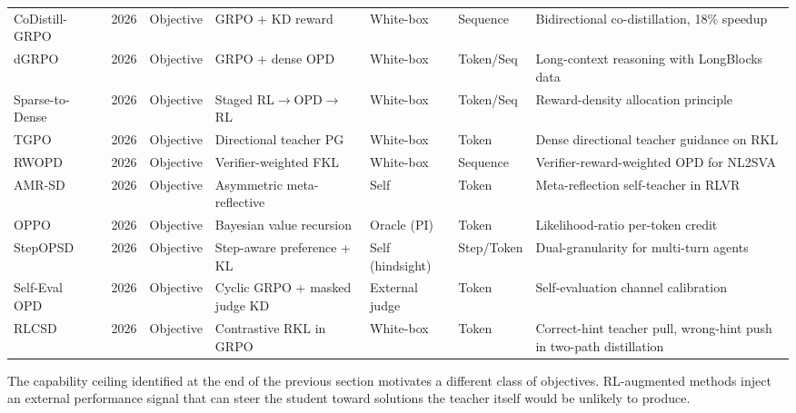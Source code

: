 \documentclass{article} %
\begin{document}
\begin{table}[t]
{\begin{tabular}{@{}lclllll@{}}
        CoDistill-GRPO~\citep{2605.08873} & 2026 & Objective & GRPO + KD reward & White-box & Sequence & Bidirectional co-distillation, 18\% speedup \\
        dGRPO~\citep{2605.12227} & 2026 & Objective & GRPO + dense OPD & White-box & Token/Seq & Long-context reasoning with LongBlocks data \\
        Sparse-to-Dense~\citep{2605.12483} & 2026 & Objective & Staged RL$\to$OPD$\to$RL & White-box & Token/Seq & Reward-density allocation principle \\
        TGPO~\citep{2605.13230} & 2026 & Objective & Directional teacher PG & White-box & Token & Dense directional teacher guidance on RKL \\
        RWOPD~\citep{2605.13501} & 2026 & Objective & Verifier-weighted FKL & White-box & Sequence & Verifier-reward-weighted OPD for NL2SVA \\
        AMR-SD~\citep{2605.18529} & 2026 & Objective & Asymmetric meta-reflective & Self & Token & Meta-reflection self-teacher in RLVR \\
        OPPO~\citep{2605.21851} & 2026 & Objective & Bayesian value recursion & Oracle (PI) & Token & Likelihood-ratio per-token credit \\
        StepOPSD~\citep{2605.27140} & 2026 & Objective & Step-aware preference + KL & Self (hindsight) & Step/Token & Dual-granularity for multi-turn agents \\
        Self-Eval OPD~\citep{2606.05122} & 2026 & Objective & Cyclic GRPO + masked judge KD & External judge & Token & Self-evaluation channel calibration \\
        RLCSD~\citep{2606.11709} & 2026 & Objective & Contrastive RKL in GRPO & White-box & Token & Correct-hint teacher pull, wrong-hint push in two-path distillation \\
        \bottomrule
    \end{tabular}
    }
\end{table}

The capability ceiling identified at the end of the previous section motivates a different class of objectives. RL-augmented methods inject an external performance signal that can steer the student toward solutions the teacher itself would be unlikely to produce.
\end{document}
